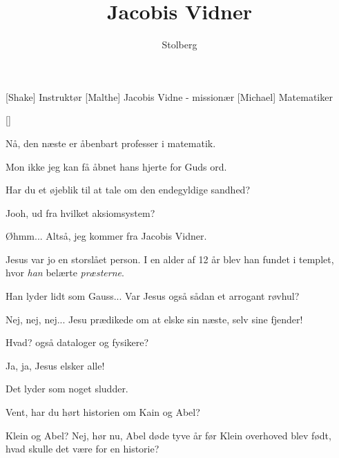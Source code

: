 \documentclass[a4paper,11pt]{article}
\title{Jacobis Vidner}
\author{Stolberg}
\begin{document}
\maketitle

\begin{roles}
[Shake] Instruktør
[Malthe] Jacobis Vidne - missionær
[Michael] Matematiker
\end{roles}

\begin{props}
[]
\end{props}
  
\begin{sketch}

 Nå, den næste er åbenbart professer i matematik.


 Mon ikke jeg kan få åbnet hans hjerte for Guds ord.


 Har du et øjeblik til at tale om den endegyldige sandhed?

 Jooh, ud fra hvilket aksiomsystem?

 Øhmm... Altså, jeg kommer fra Jacobis Vidner.

 Jesus var jo en storslået person. I en alder af 12 år blev han fundet i templet, hvor \emph{han} belærte \emph{præsterne}.

 Han lyder lidt som Gauss... Var Jesus også sådan et arrogant røvhul?


 Nej, nej, nej... Jesu prædikede om at elske sin næste, selv sine fjender!

 Hvad? også dataloger og fysikere?

 Ja, ja, Jesus elsker alle!

 Det lyder som noget sludder.


 Vent, har du hørt historien om Kain og Abel?

 Klein og Abel? Nej, hør nu, Abel døde tyve år før Klein overhoved blev født, hvad skulle det være for en historie?


\end{sketch}
\end{document}
